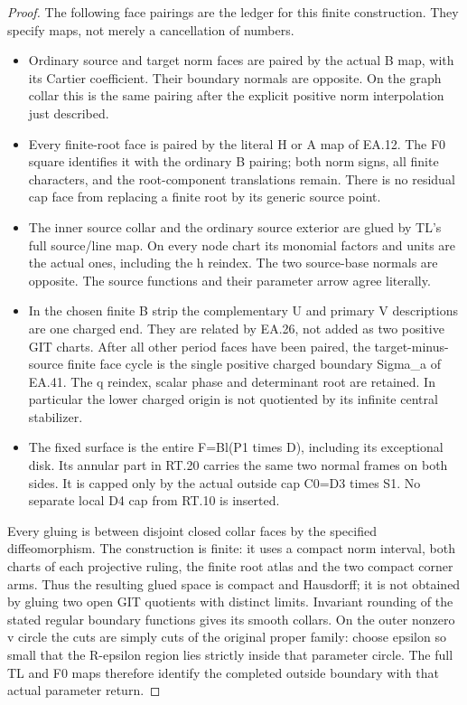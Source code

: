 \begin{proof}
The following face pairings are the ledger for this finite
construction. They specify maps, not merely a cancellation of
numbers.

\begin{itemize}
\item Ordinary source and target norm faces are paired by the actual
B map, with its Cartier coefficient. Their boundary normals
are opposite. On the graph collar this is the same pairing
after the explicit positive norm interpolation just described.
\item Every finite-root face is paired by the literal H or A map of
EA.12. The F0 square identifies it with the ordinary B pairing;
both norm signs, all finite characters, and the root-component
translations remain. There is no residual cap face from replacing
a finite root by its generic source point.
\item The inner source collar and the ordinary source exterior are
glued by TL's full source/line map. On every node chart its
monomial factors and units are the actual ones, including the
h reindex. The two source-base normals are opposite. The
source functions and their parameter arrow agree literally.
\item In the chosen finite B strip the complementary U and primary
V descriptions are one charged end. They are related by EA.26,
not added as two positive GIT charts. After all other period
faces have been paired, the target-minus-source finite face
cycle is the single positive charged boundary Sigma\_a of
EA.41. The q reindex, scalar phase and determinant root are
retained. In particular the lower charged origin is not
quotiented by its infinite central stabilizer.
\item The fixed surface is the entire
F=Bl(P1 times D), including its exceptional disk. Its annular
part in RT.20 carries the same two normal frames on both
sides. It is capped only by the actual outside cap C0=D3
times S1. No separate local D4 cap from RT.10 is inserted.

\end{itemize}
Every gluing is between disjoint closed collar faces by the
specified diffeomorphism. The construction is finite: it uses a
compact norm interval, both charts of each projective ruling,
the finite root atlas and the two compact corner arms. Thus the
resulting glued space is compact and Hausdorff; it is not obtained
by gluing two open GIT quotients with distinct limits. Invariant
rounding of the stated regular boundary functions gives its smooth
collars. On the outer nonzero v circle the cuts are simply cuts
of the original proper family: choose epsilon so small that the
R-epsilon region lies strictly inside that parameter circle.
The full TL and F0 maps therefore identify the completed outside
boundary with that actual parameter return.


\end{proof}
